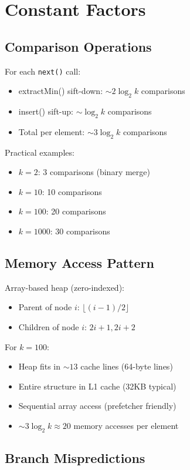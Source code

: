 \documentclass[11pt]{article}
\begin{document}
\section{Constant Factors}

\subsection{Comparison Operations}

For each \texttt{next()} call:
\begin{itemize}
    \item extractMin() sift-down: $\sim 2 \log_2 k$ comparisons
    \item insert() sift-up: $\sim \log_2 k$ comparisons
    \item Total per element: $\sim 3 \log_2 k$ comparisons
\end{itemize}

Practical examples:
\begin{itemize}
    \item $k = 2$: 3 comparisons (binary merge)
    \item $k = 10$: 10 comparisons
    \item $k = 100$: 20 comparisons
    \item $k = 1000$: 30 comparisons
\end{itemize}

\subsection{Memory Access Pattern}

Array-based heap (zero-indexed):
\begin{itemize}
    \item Parent of node $i$: $\lfloor (i-1)/2 \rfloor$
    \item Children of node $i$: $2i+1, 2i+2$
\end{itemize}

For $k = 100$:
\begin{itemize}
    \item Heap fits in $\sim 13$ cache lines (64-byte lines)
    \item Entire structure in L1 cache (32KB typical)
    \item Sequential array access (prefetcher friendly)
    \item $\sim 3 \log_2 k \approx 20$ memory accesses per element
\end{itemize}

\subsection{Branch Mispredictions}
\end{document}
